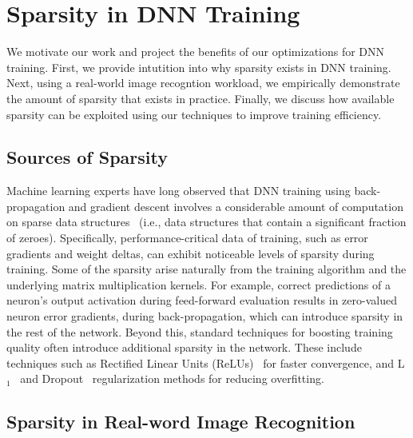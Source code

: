\section{Sparsity in DNN Training}
 \label{sec:sparse_dnn_training}
 
 We motivate our work and project the benefits of our optimizations for DNN training.  First, we provide intutition into why sparsity exists in DNN training.  Next, using a real-world image recogntion workload, we empirically demonstrate the amount of sparsity that exists in practice.  Finally, we discuss how available sparsity can be exploited using our techniques to improve training efficiency. 
 
\subsection{Sources of Sparsity}
\label{subsec:sparsity_source}

Machine learning experts have long observed that DNN training using back-propagation and gradient descent involves a considerable amount of computation on sparse data structures~\cite{Ng04, Nair10, Krizhevsky12, Bengio13, Srivastava14a} (i.e., data structures that contain a significant fraction of zeroes).  Specifically, performance-critical data of training, such as error gradients and weight deltas, can exhibit noticeable levels of sparsity during training.   Some of the sparsity arise naturally from the training algorithm  and the underlying matrix multiplication kernels.  For example, correct predictions of a neuron's output activation during feed-forward evaluation results in zero-valued neuron error gradients, during back-propagation, which can introduce sparsity in the rest of the network.  Beyond this, standard techniques for boosting training quality often introduce additional sparsity in the network.  These include techniques such as Rectified Linear Units (ReLUs)~\cite{Nair10, Krizhevsky12} for faster convergence, and  L$_1$~\cite{Ng04, Bengio13} and Dropout~\cite{Srivastava14a} regularization methods for reducing overfitting. 

\subsection{Sparsity in Real-word Image Recognition}
\label{subsec:sparsity_profile}

